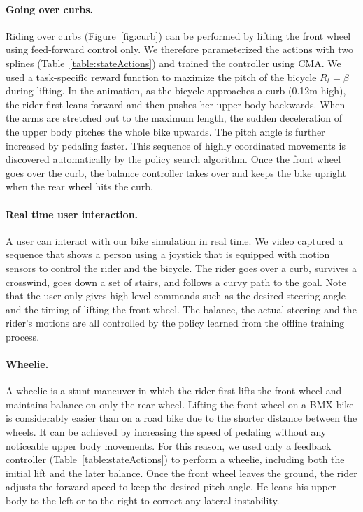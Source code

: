 \paragraph{Going over curbs.} Riding over curbs (Figure~\ref{fig:curb}) can be performed by lifting the front wheel using feed-forward control only. We therefore parameterized the actions with two splines (Table~\ref{table:stateActions}) and trained the controller using CMA. We used a task-specific reward function to maximize the pitch of the bicycle $R_t = \beta$ during lifting. In the animation, as the bicycle approaches a curb (0.12m high), the rider first leans forward and then pushes her upper body backwards. When the arms are stretched out to the maximum length, the sudden deceleration of the upper body pitches the whole bike upwards. The pitch angle is further increased by pedaling faster. This sequence of highly coordinated movements is discovered automatically by the policy search algorithm. Once the front wheel goes over the curb, the balance controller takes over and keeps the bike upright when the rear wheel hits the curb.

\paragraph{Real time user interaction.} A user can interact with our bike simulation in real time. We video captured a sequence that shows a person using a joystick that is equipped with motion sensors to control the rider and the bicycle. The rider goes over a curb, survives a crosswind, goes down a set of stairs, and follows a curvy path to the goal. Note that the user only gives high level commands such as the desired steering angle and the timing of lifting the front wheel. The balance, the actual steering and the rider's motions are all controlled by the policy learned from the offline training process.

\paragraph{Wheelie.} A wheelie is a stunt maneuver in which the rider first lifts the front wheel and maintains balance on only the rear wheel. Lifting the front wheel on a BMX bike is considerably easier than on a road bike due to the shorter distance between the wheels. It can be achieved by increasing the speed of pedaling without any noticeable upper body movements. For this reason, we used only a feedback controller (Table~\ref{table:stateActions}) to perform a wheelie, including both the initial lift and the later balance. Once the front wheel leaves the ground, the rider adjusts the forward speed to keep the desired pitch angle. He leans his upper body to the left or to the right to correct any lateral instability.

